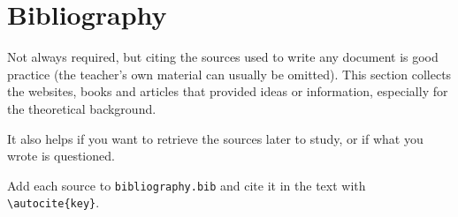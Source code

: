 \section{Bibliography}
Not always required, but citing the sources used to write any document is good practice (the teacher's own material can usually be omitted). This section collects the websites, books and articles that provided ideas or information, especially for the theoretical background.

It also helps if you want to retrieve the sources later to study, or if what you wrote is questioned.

Add each source to \texttt{bibliography.bib} and cite it in the text with \verb|\autocite{key}|.

\printbibliography[heading=none]
